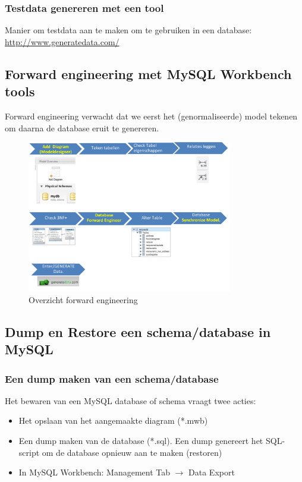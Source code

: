 \documentclass{article}
\begin{document}
\subsubsection{Testdata genereren met een tool}
Manier om testdata aan te maken om te gebruiken in een database: \url{http://www.generatedata.com/}

\subsection{Forward engineering met MySQL Workbench tools}
Forward engineering verwacht dat we eerst het (genormaliseerde) model tekenen om daarna de database eruit te genereren.

\begin{figure}[H]
    \centering
    \includegraphics[width=0.8\textwidth]{overzicht-forward-engineering.png}
    \caption{Overzicht forward engineering}
\end{figure}

\subsection{Dump en Restore een schema/database in MySQL}
\subsubsection{Een dump maken van een schema/database}
Het bewaren van een MySQL database of schema vraagt twee acties:

\begin{itemize}
    \item Het opslaan van het aangemaakte diagram (*.mwb)
    \item Een dump maken van de database (*.sql). Een dump genereert het SQL-script om de database opnieuw aan te maken (restoren)
    \item In MySQL Workbench: Management Tab $\rightarrow$ Data Export
\end{itemize}
\end{document}
